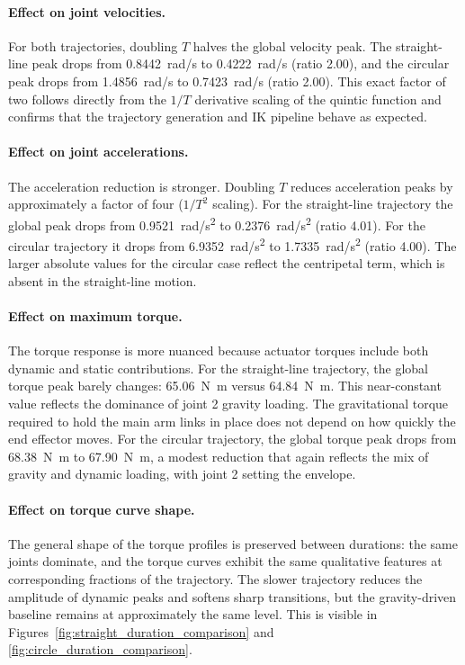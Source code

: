 \documentclass[12pt,a4paper]{article}
\begin{document}
\paragraph{Effect on joint velocities.}
For both trajectories, doubling $T$ halves the global velocity peak. The straight-line peak
drops from \SI{0.8442}{rad/s} to \SI{0.4222}{rad/s} (ratio 2.00), and the circular peak
drops from \SI{1.4856}{rad/s} to \SI{0.7423}{rad/s} (ratio 2.00). This exact factor of two
follows directly from the $1/T$ derivative scaling of the quintic function and confirms that
the trajectory generation and IK pipeline behave as expected.

\paragraph{Effect on joint accelerations.}
The acceleration reduction is stronger. Doubling $T$ reduces acceleration peaks by
approximately a factor of four ($1/T^2$ scaling). For the straight-line trajectory the global
peak drops from \SI{0.9521}{rad/s^2} to \SI{0.2376}{rad/s^2} (ratio 4.01). For the circular
trajectory it drops from \SI{6.9352}{rad/s^2} to \SI{1.7335}{rad/s^2} (ratio 4.00). The
larger absolute values for the circular case reflect the centripetal term, which is absent in
the straight-line motion.

\paragraph{Effect on maximum torque.}
The torque response is more nuanced because actuator torques include both dynamic and static
contributions. For the straight-line trajectory, the global torque peak barely changes:
\SI{65.06}{N.m} versus \SI{64.84}{N.m}. This near-constant value reflects the dominance of
joint 2 gravity loading. The gravitational torque required to hold the main arm links in
place does not depend on how quickly the end effector moves. For the circular trajectory, the
global torque peak drops from \SI{68.38}{N.m} to \SI{67.90}{N.m}, a modest reduction that
again reflects the mix of gravity and dynamic loading, with joint 2 setting the envelope.

\paragraph{Effect on torque curve shape.}
The general shape of the torque profiles is preserved between durations: the same joints
dominate, and the torque curves exhibit the same qualitative features at corresponding
fractions of the trajectory. The slower trajectory reduces the amplitude of dynamic peaks and
softens sharp transitions, but the gravity-driven baseline remains at approximately the same
level. This is visible in Figures~\ref{fig:straight_duration_comparison} and
\ref{fig:circle_duration_comparison}.
\end{document}
